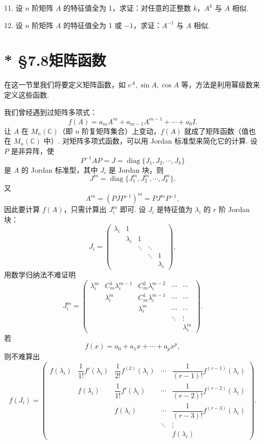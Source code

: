 \documentclass[UTF8, 12pt, fontset=fandol, oneside]{ctexart}
\begin{document}
11. 设 $n$ 阶矩阵 $A$ 的特征值全为 1，求证：对任意的正整数 $k$，$A^k$ 与 $A$ 相似.

12. 设 $n$ 阶矩阵 $A$ 的特征值全为 1 或 $-1$，求证：$A^{-1}$ 与 $A$ 相似.

\section*{* §7.8\quad 矩阵函数}

在这一节里我们将要定义矩阵函数，如 $e^A,\sin A,\cos A$ 等，方法是利用幂级数来定义这些函数.

我们曾经遇到过矩阵多项式：
\[
f(A)=a_mA^m+a_{m-1}A^{m-1}+\cdots+a_0I.
\]
让 $A$ 在 $M_n(\mathbb C)$（即 $n$ 阶复矩阵集合）上变动，$f(A)$ 就成了矩阵函数（值也在 $M_n(\mathbb C)$ 中）. 对矩阵多项式函数，可以用 Jordan 标准型来简化它的计算. 设 $P$ 是非异阵，使
\[
P^{-1}AP=J=\operatorname{diag}\{J_1,J_2,\cdots,J_k\}
\]
是 $A$ 的 Jordan 标准型，其中 $J_i$ 是 Jordan 块，则
\[
J^m=\operatorname{diag}\{J_1^m,J_2^m,\cdots,J_k^m\}.
\]
又
\[
A^m=(PJP^{-1})^m=PJ^mP^{-1},
\]
因此要计算 $f(A)$，只需计算出 $J_i^m$ 即可. 设 $J_i$ 是特征值为 $\lambda_i$ 的 $r$ 阶 Jordan 块：
\[
J_i=\left(\begin{array}{ccccc}
\lambda_i & 1 & & & \\
& \lambda_i & 1 & & \\
& & \ddots & \ddots & \\
& & & \ddots & 1\\
& & & & \lambda_i
\end{array}\right),
\]
用数学归纳法不难证明
\begin{equation}
J_i^m=\left(\begin{array}{ccccc}
\lambda_i^m & C_m^1\lambda_i^{m-1} & C_m^2\lambda_i^{m-2} & \cdots & \cdots\\
& \lambda_i^m & C_m^1\lambda_i^{m-1} & \cdots & \cdots\\
& & \lambda_i^m & \cdots & \cdots\\
& & & \ddots & \vdots\\
& & & & \lambda_i^m
\end{array}\right).
\tag{7.8.1}
\end{equation}
若
\[
f(x)=a_0+a_1x+\cdots+a_px^p,
\]
则不难算出
\begin{equation}
f(J_i)=\left(\begin{array}{ccccc}
f(\lambda_i) & \dfrac1{1!}f'(\lambda_i) & \dfrac1{2!}f^{(2)}(\lambda_i) & \cdots & \dfrac1{(r-1)!}f^{(r-1)}(\lambda_i)\\
& f(\lambda_i) & \dfrac1{1!}f'(\lambda_i) & \cdots & \dfrac1{(r-2)!}f^{(r-2)}(\lambda_i)\\
& & f(\lambda_i) & \cdots & \dfrac1{(r-3)!}f^{(r-3)}(\lambda_i)\\
& & & \ddots & \vdots\\
& & & & f(\lambda_i)
\end{array}\right).
\tag{7.8.2}
\end{equation}
\end{document}
